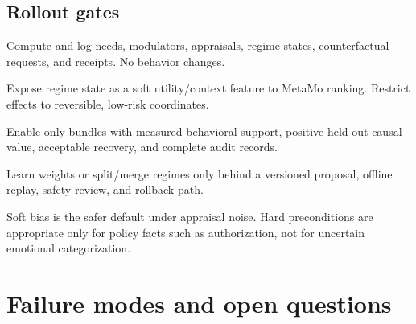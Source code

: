 \documentclass[11pt]{article}
\begin{document}
\subsection{Rollout gates}

\begin{description}[leftmargin=0.24\textwidth,style=nextline]
  \item[Shadow] Compute and log needs, modulators, appraisals, regime states,
  counterfactual requests, and receipts.  No behavior changes.
  \item[Advisory] Expose regime state as a soft utility/context feature to
  MetaMo ranking.  Restrict effects to reversible, low-risk coordinates.
  \item[Governed actuation] Enable only bundles with measured behavioral support,
  positive held-out causal value, acceptable recovery, and complete audit records.
  \item[Adaptive palette] Learn weights or split/merge regimes only behind a
  versioned proposal, offline replay, safety review, and rollback path.
\end{description}

Soft bias is the safer default under appraisal noise.  Hard preconditions are
appropriate only for policy facts such as authorization, not for uncertain
emotional categorization.

\section{Failure modes and open questions}
\end{document}

